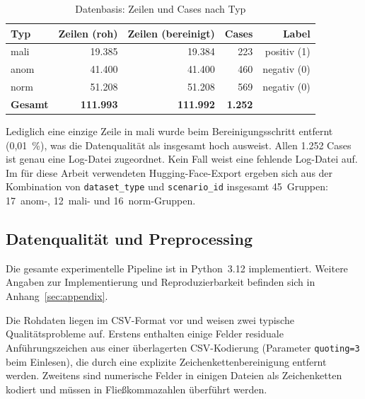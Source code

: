\begin{table}[htb]
  \centering
  \caption{Datenbasis: Zeilen und Cases nach Typ}
  \label{tab:datenbasis}
  \begin{tabular}{lrrrr}
    \hline
    \textbf{Typ} & \textbf{Zeilen (roh)} & \textbf{Zeilen (bereinigt)} & \textbf{Cases} & \textbf{Label} \\
    \hline
    mali  & 19.385 & 19.384 & 223 & positiv (1) \\
    anom  & 41.400 & 41.400 & 460 & negativ (0) \\
    norm  & 51.208 & 51.208 & 569 & negativ (0) \\
    \hline
    \textbf{Gesamt} & \textbf{111.993} & \textbf{111.992} & \textbf{1.252} & \\
    \hline
  \end{tabular}
\end{table}

Lediglich eine einzige Zeile in mali wurde beim Bereinigungsschritt entfernt (0{,}01~\%), was die Datenqualität als insgesamt hoch ausweist. Allen 1.252 Cases ist genau eine Log-Datei zugeordnet. Kein Fall weist eine fehlende Log-Datei auf. Im für diese Arbeit verwendeten Hugging-Face-Export ergeben sich aus der Kombination von \texttt{dataset\_type} und \texttt{scenario\_id} insgesamt 45~Gruppen: 17~anom-, 12~mali- und 16~norm-Gruppen.

\subsection{Datenqualität und Preprocessing}

Die gesamte experimentelle Pipeline ist in Python~3.12 implementiert. Weitere Angaben
zur Implementierung und Reproduzierbarkeit befinden sich in Anhang~\ref{sec:appendix}.

Die Rohdaten liegen im CSV-Format vor und weisen zwei typische Qualitätsprobleme auf. Erstens enthalten einige Felder residuale Anführungszeichen aus einer überlagerten CSV-Kodierung (Parameter \texttt{quoting=3} beim Einlesen), die durch eine explizite Zeichenkettenbereinigung entfernt werden. Zweitens sind numerische Felder in einigen Dateien als Zeichenketten kodiert und müssen in Fließkommazahlen überführt werden.

